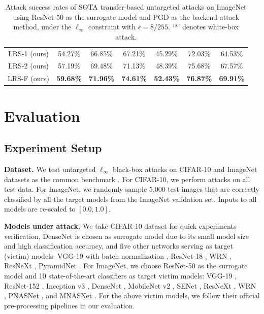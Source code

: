 \documentclass[letterpaper]{article} %
\theoremstyle{plain}
\theoremstyle{definition}
\begin{document}
\begin{table}[ht!]
\begin{center}
{\begin{tabular}{ccccccc}
LRS-1 (ours)   & 54.27\% & 66.85\% & 67.21\% & 45.29\% & 72.03\% & {64.53\%} \\
LRS-2 (ours)   & 57.19\% & 69.48\% & 71.13\% & 48.39\% & 75.68\% & {67.57\%} \\
LRS-F (ours) &  \textbf{59.68\%}  & \textbf{71.96\%}& \textbf{74.61\%} & \textbf{52.43\%} & \textbf{76.87\%}  & {\textbf{69.91\%}}  \\
\bottomrule
\end{tabular}
} 
\caption{Attack success rates of SOTA transfer-based untargeted attacks on ImageNet using ResNet-50 as the surrogate model and PGD as the backend attack method, under the $\ell_\infty$ constraint with $\epsilon=8/255$. `*' denotes white-box attack.}
\label{tab:comapre_imagenet}
\end{center} 
\end{table}

\section{Evaluation} \label{sec:experiments}

\subsection{Experiment Setup} 
{\bf Dataset.} We test untargeted $\ell_{\infty}$ black-box attacks on CIFAR-10 \cite{krizhevsky2009learning} and ImageNet \cite{russakovsky2015imagenet} datasets as the common benchmark \cite{dong2018boosting,dong2019evading,guo2020backpropagating,li2023making}. For CIFAR-10, we perform attacks on all test data. For ImageNet, we randomly sample 5,000 test images that are correctly classified by all the target models from the ImageNet validation set. Inputs to all models are re-scaled to $[0.0,1.0]$.

\textbf{Models under attack.} We take CIFAR-10 dataset for quick experiments verification, DenseNet \cite{Huang2017densely} is chosen as surrogate model due to its small model size and high classification accuracy, and five other networks serving as target (victim) models: VGG-19 with batch normalization \cite{Simonyan2015}, ResNet-18 \cite{He2016}, WRN \cite{Zagoruyko2016}, ResNeXt \cite{Xie2017aggregated}, PyramidNet  \cite{Han2017}. 
For ImageNet, we choose ResNet-50 \cite{He2016} as the surrogate model and 10 state-of-the-art classifiers as target victim models: VGG-19 \cite{Simonyan2015}, ResNet-152 \cite{He2016}, Inception v3 \cite{Szegedy2016}, DenseNet \cite{Huang2017densely}, MobileNet v2 \cite{Sandler2018mobilenetv2}, SENet \cite{Hu2018}, ResNeXt \cite{Xie2017aggregated}, WRN \cite{Zagoruyko2016}, PNASNet \cite{Liu2018}, and MNASNet \cite{Tan2019mnasnet}. For the above victim models, we follow their official pre-processing pipelines in our evaluation.
\end{document}
